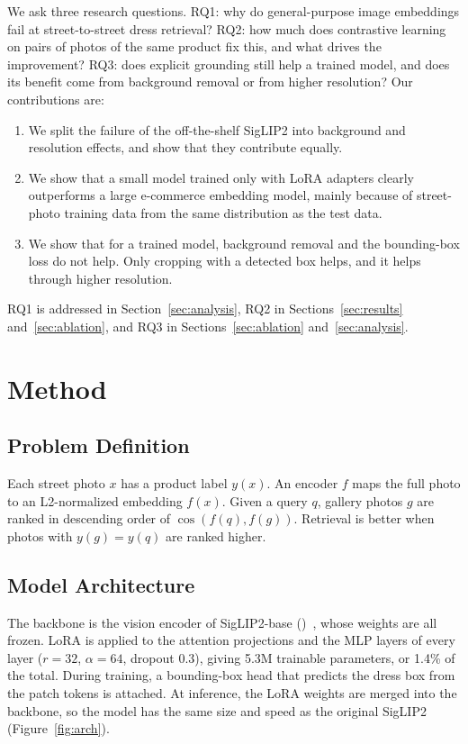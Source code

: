 \documentclass[sigconf,nonacm]{acmart}
\begin{document}
We ask three research questions. RQ1: why do general-purpose image embeddings fail at street-to-street dress retrieval? RQ2: how much does contrastive learning on pairs of photos of the same product fix this, and what drives the improvement? RQ3: does explicit grounding still help a trained model, and does its benefit come from background removal or from higher resolution? Our contributions are:
\begin{enumerate}
  \item We split the failure of the off-the-shelf SigLIP2 into background and resolution effects, and show that they contribute equally.
  \item We show that a small model trained only with LoRA adapters clearly outperforms a large e-commerce embedding model, mainly because of street-photo training data from the same distribution as the test data.
  \item We show that for a trained model, background removal and the bounding-box loss do not help. Only cropping with a detected box helps, and it helps through higher resolution.
\end{enumerate}
RQ1 is addressed in Section~\ref{sec:analysis}, RQ2 in Sections~\ref{sec:results} and~\ref{sec:ablation}, and RQ3 in Sections~\ref{sec:ablation} and~\ref{sec:analysis}.

\section{Method}

\subsection{Problem Definition}

Each street photo $x$ has a product label $y(x)$. An encoder $f$ maps the full photo to an L2-normalized embedding $f(x)$. Given a query $q$, gallery photos $g$ are ranked in descending order of $\cos(f(q), f(g))$. Retrieval is better when photos with $y(g) = y(q)$ are ranked higher.

\subsection{Model Architecture}

The backbone is the vision encoder of SigLIP2-base ()~\cite{tschannen2025siglip2}, whose weights are all frozen. LoRA is applied to the attention projections and the MLP layers of every layer ($r = 32$, $\alpha = 64$, dropout $0.3$), giving 5.3M trainable parameters, or 1.4\% of the total. During training, a bounding-box head that predicts the dress box from the patch tokens is attached. At inference, the LoRA weights are merged into the backbone, so the model has the same size and speed as the original SigLIP2 (Figure~\ref{fig:arch}).
\end{document}
